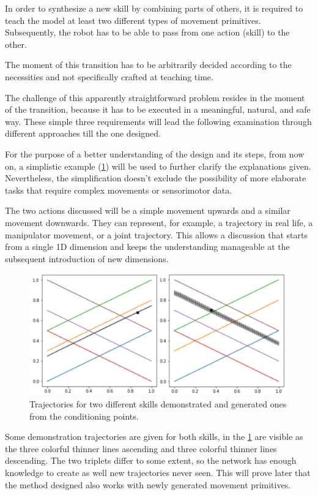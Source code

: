 In order to synthesize a new skill by combining parts of others, it is required to teach the model at least two different types of movement primitives. Subsequently, the robot has to be able to pass from one action (skill) to the other. 

The moment of this transition has to be arbitrarily decided according to the necessities and not specifically crafted at teaching time. 

The challenge of this apparently straightforward problem resides in the moment of the transition, because it has to be executed in a meaningful, natural, and safe way. These simple three requirements will lead the following examination through different approaches till the one designed. 

For the purpose of a better understanding of the design and its steps, from now on, a simplistic example (\cref{fig:trajX}) will be used to further clarify the explanations given. Nevertheless, the simplification doesn't exclude the possibility of more elaborate tasks that require complex movements or sensorimotor data. 

The two actions discussed will be a simple movement upwards and a similar movement downwards. They can represent, for example, a trajectory in real life, a manipulator movement, or a joint trajectory. This allows a discussion that starts from a single 1D dimension and keeps the understanding manageable at the subsequent introduction of new dimensions. 

\begin{figure}
    \centering
    \includegraphics[width=0.8\linewidth]{figures/trajX.png}
    \caption{Trajectories for two different skills demonstrated and generated ones from the conditioning points.}
    \label{fig:trajX}
\end{figure}

Some demonstration trajectories are given for both skills, in the \cref{fig:trajX} are visible as the three colorful thinner lines ascending and three colorful thinner lines descending. The two triplets differ to some extent, so the network has enough knowledge to create as well new trajectories never seen. This will prove later that the method designed also works with newly generated movement primitives. 

